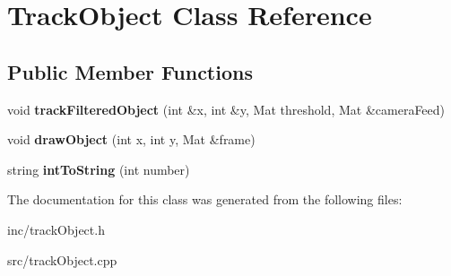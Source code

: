 \hypertarget{class_track_object}{}\section{Track\+Object Class Reference}
\label{class_track_object}
\subsection*{Public Member Functions}
\begin{DoxyCompactItemize}
\item 
void {\bfseries track\+Filtered\+Object} (int \&x, int \&y, Mat threshold, Mat \&camera\+Feed)\hypertarget{class_track_object_a47930962ed05342a7944e0983b44dcfd}{}\label{class_track_object_a47930962ed05342a7944e0983b44dcfd}

\item 
void {\bfseries draw\+Object} (int x, int y, Mat \&frame)\hypertarget{class_track_object_a46528f85400eb695f023de87e3eaa082}{}\label{class_track_object_a46528f85400eb695f023de87e3eaa082}

\item 
string {\bfseries int\+To\+String} (int number)\hypertarget{class_track_object_a7322039b592a9af2072c26963a9c843f}{}\label{class_track_object_a7322039b592a9af2072c26963a9c843f}

\end{DoxyCompactItemize}


The documentation for this class was generated from the following files\+:\begin{DoxyCompactItemize}
\item 
inc/track\+Object.\+h\item 
src/track\+Object.\+cpp\end{DoxyCompactItemize}

